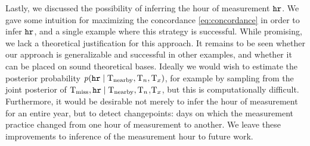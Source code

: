 Lastly, we discussed the possibility of inferring the hour of measurement \(\hour\).
We gave some intuition for maximizing the concordance \autoref{eq:concordance} in order to infer \(\hour\), and a single example where this strategy is successful.
While promising, we lack a theoretical justification for this approach.
It remains to be seen whether our approach is generalizable and successful in other examples, and whether it can be placed on sound theoretical bases.
Ideally we would wish to estimate the posterior probability \(\prob\del{\hour \mid \Temp_\obs,\Tn,\Tx}\), for example by sampling from the joint posterior of \(\Temp_\miss, \hour \mid \Temp_\obs,\)\(\Tn\),\(\Tx\), but this is computationally difficult.
Furthermore, it would be desirable not merely to infer the hour of measurement for an entire year, but to detect changepoints: days on which the measurement practice changed from one hour of measurement to another.
We leave these improvements to inference of the measurement hour to future work.
